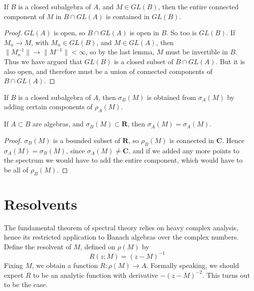 \begin{theorem}
    If $B$ is a closed subalgebra of $A$, and $M \in GL(B)$, then the entire connected component of $M$ in $B \cap GL(A)$ is contained in $GL(B)$.
\end{theorem}
\begin{proof}
    $GL(A)$ is open, so $B \cap GL(A)$ is open in $B$. So too is $GL(B)$. If $M_n \to M$, with $M_n \in GL(B)$, and $M \in GL(A)$, then $\| M_n^{-1} \| \to \| M^{-1} \| < \infty$, so by the last lemma, $M$ must be invertible in $B$. Thus we have argued that $GL(B)$ is a closed subset of $B \cap GL(A)$. But it is also open, and therefore must be a union of connected components of $B \cap GL(A)$.
\end{proof}

\begin{corollary}
    If $B$ is a closed subalgebra of $A$, then $\sigma_B(M)$ is obtained from $\sigma_A(M)$ by adding certain components of $\rho_A(M)$.
\end{corollary}

\begin{corollary}
    If $A \subset B$ are algebras, and $\sigma_B(M) \subset \mathbf{R}$, then $\sigma_A(M) = \sigma_A(M)$.
\end{corollary}
\begin{proof}
    $\sigma_B(M)$ is a bounded subset of $\mathbf{R}$, so $\rho_B(M)$ is connected in $\mathbf{C}$. Hence $\sigma_A(M) = \sigma_B(M)$, since $\sigma_A(M) \neq \mathbf{C}$, and if we added any more points to the spectrum we would have to add the entire component, which would have to be all of $\rho_B(M)$.
\end{proof}

\section{Resolvents}

The fundamental theorem of spectral theory relies on heavy complex analysis, hence its restricted application to Banach algebras over the complex numbers. Define the resolvent of $M$, defined on $\rho(M)$ by
%
\[ R(z; M) = (z - M)^{-1} \]
%
Fixing $M$, we obtain a function $R: \rho(M) \to A$. Formally speaking, we should expcet $R$ to be an analytic function with derivative $-(z - M)^{-2}$. This turns out to be the case.


